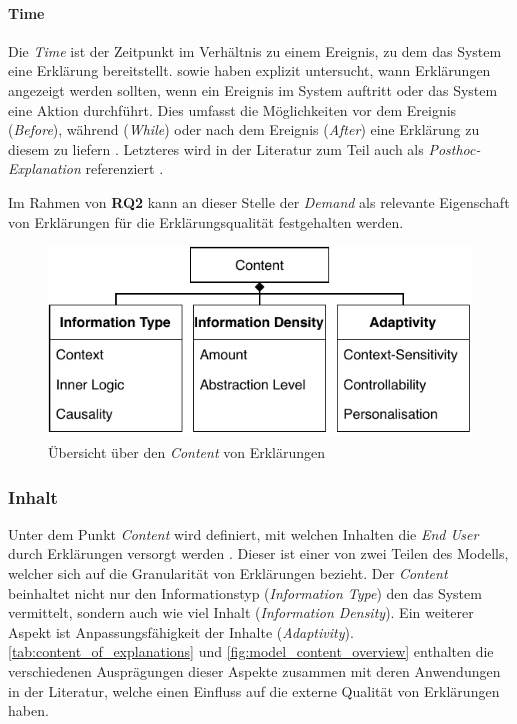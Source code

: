 \paragraph{Time} Die \textit{Time} ist der Zeitpunkt im Verhältnis zu einem Ereignis, zu dem das System eine Erklärung bereitstellt. \citeauthor{rosenfeld_explainability_2019} sowie \citeauthor{wiegand_id_2020} haben explizit untersucht, wann Erklärungen angezeigt werden sollten, wenn ein Ereignis im System auftritt oder das System eine Aktion durchführt. Dies umfasst die Möglichkeiten vor dem Ereignis (\textit{Before}), während (\textit{While}) oder nach dem Ereignis (\textit{After}) eine Erklärung zu diesem zu liefern \cite{rosenfeld_explainability_2019, wiegand_id_2020}. Letzteres wird in der Literatur zum Teil auch als \textit{Posthoc-Explanation} referenziert \cite{sokol_explainability_2020}.

\smallskip

Im Rahmen von \textbf{RQ2} kann an dieser Stelle der \textit{Demand} als relevante Eigenschaft von Erklärungen für die Erklärungsqualität festgehalten werden.

\begin{figure}[htb!]
    \begin{center}
        \includegraphics{contents/05_model_description/res/model_content_overview.pdf}
    \end{center}
    \caption{Übersicht über den \textit{Content} von Erklärungen}
    \label{fig:model_content_overview}
\end{figure}

\subsubsection{Inhalt}

Unter dem Punkt \textit{Content} wird definiert, mit welchen Inhalten die \textit{End User} durch Erklärungen versorgt werden \cite{nunes_systematic_2017}. Dieser ist einer von zwei Teilen des Modells, welcher sich auf die Granularität von Erklärungen bezieht. Der \textit{Content} beinhaltet nicht nur den Informationstyp (\textit{Information Type}) den das System vermittelt, sondern auch wie viel Inhalt (\textit{Information Density}). Ein weiterer Aspekt ist Anpassungsfähigkeit der Inhalte (\textit{Adaptivity}). \autoref{tab:content_of_explanations} und \autoref{fig:model_content_overview} enthalten die verschiedenen Ausprägungen dieser Aspekte zusammen mit deren Anwendungen in der Literatur, welche einen Einfluss auf die externe Qualität von Erklärungen haben.

